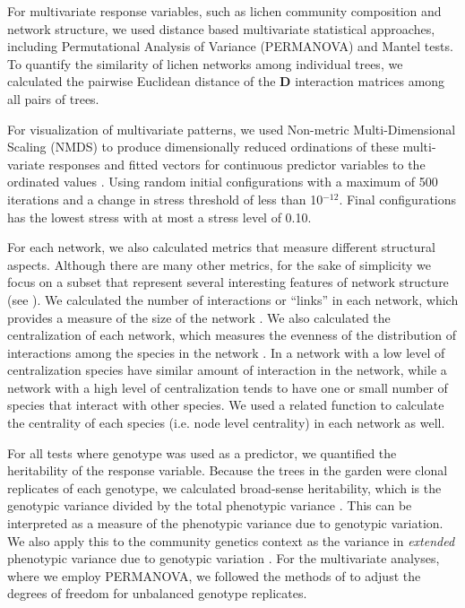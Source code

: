 \documentclass[11pt,twocolumn,twoside,lineno]{pnas-new}
\begin{document}
{For multivariate response variables, such as lichen community
composition and network structure, we used distance based multivariate
statistical approaches, including Permutational Analysis of Variance
(PERMANOVA) and Mantel tests. To quantify the similarity of lichen
networks among individual trees, we calculated the pairwise Euclidean
distance of the $\mathbf{D}$ interaction matrices among all pairs of
trees.

For visualization of multivariate patterns, we used Non-metric
Multi-Dimensional Scaling (NMDS) \cite{ecodist} to produce
dimensionally reduced ordinations of these multi-variate responses and
fitted vectors for continuous predictor variables to the ordinated
values \cite{vegan}. Using random initial configurations with a
maximum of 500 iterations and a change in stress threshold of less
than 10$^{-12}$. Final configurations has the lowest stress with at
most a stress level of 0.10.

For each network, we also calculated metrics that measure different
structural aspects. Although there are many other metrics, for the
sake of simplicity we focus on a subset that represent several
interesting features of network structure (see \citep{Lau2017a}). We
calculated the number of interactions or ``links'' in each network,
which provides a measure of the size of the network \citep{Lau2015a,
  Borrett2014EnaR:Analysis}. We also calculated the centralization of
each network, which measures the evenness of the distribution of
interactions among the species in the network \cite{sna}. In a network
with a low level of centralization species have similar amount of
interaction in the network, while a network with a high level of
centralization tends to have one or small number of species that
interact with other species. We used a related function to calculate
the centrality of each species (i.e. node level centrality) in each
network as well.

For all tests where genotype was used as a predictor, we quantified
the heritability of the response variable. Because the trees in the
garden were clonal replicates of each genotype, we calculated
broad-sense heritability, which is the genotypic variance divided by
the total phenotypic variance \cite{Conner2004ATextbook}. This can be
interpreted as a measure of the phenotypic variance due to genotypic
variation. We also apply this to the community genetics context as the
variance in \textit{extended} phenotypic variance due to genotypic
variation \cite{DawkinsTheGene}. For the multivariate analyses, where
we employ PERMANOVA, we followed the methods of
\citep{Shuster2006COMMUNITYSTRUCTURE} to adjust the degrees of freedom
for unbalanced genotype replicates.

}
\end{document}
